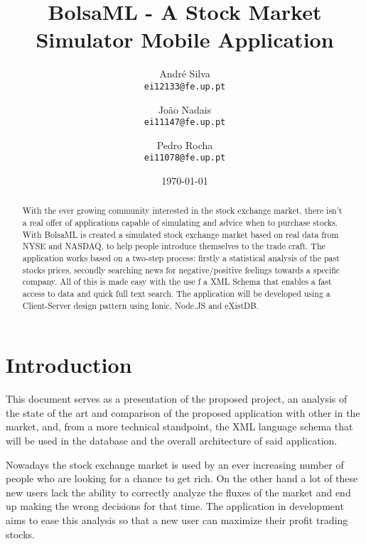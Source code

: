 \documentclass[twocolumn,twoside,11pt,a4paper]{article}
\title{\vspace{-15mm}\fontsize{24pt}{10pt}\selectfont\textbf{BolsaML - A Stock Market Simulator Mobile Application}} %
\author{André Silva\\
\small \texttt{ei12133@fe.up.pt}\\
\and
João Nadais\\
\small \texttt{ei11147@fe.up.pt}
\vspace{-5mm}
\and
Pedro Rocha\\
\small \texttt{ei11078@fe.up.pt}
\vspace{-5mm}
}
\date{\today}
\begin{document}
\maketitle
\thispagestyle{plain}            %


\begin{abstract}
With the ever growing community interested in the stock exchange market, there isn't a real offer of
applications capable of simulating and advice when to purchase stocks. With BolsaML is created a simulated
stock exchange market based on real data from NYSE and NASDAQ, to help people introduce themselves to the trade craft.
The application works based on a two-step process: firstly a statistical analysis of the past stocks prices, 
secondly searching news for negative/positive feelings towards a specific company. All of this is made easy
with the use f a XML Schema that enables a fast access to data and quick full text search.
The application will be developed using a Client-Server design pattern using Ionic, Node.JS and eXistDB.
\end{abstract}


\section{Introduction}\label{sec:intro}

This document serves as a presentation of the proposed project, an analysis of the state of the art and comparison of the proposed application with other in the market, and, from a more technical standpoint, the XML language schema that will be used in the database and the overall architecture of said application.

Nowadays the stock exchange market is used by an ever increasing number of people
who are looking for a chance to get rich. On the other hand a lot of these new users
lack the ability to correctly analyze the fluxes of the market and end up making
the wrong decisions for that time. The application in development aims to ease 
this analysis so that a new user can maximize their profit trading stocks.
\end{document}
